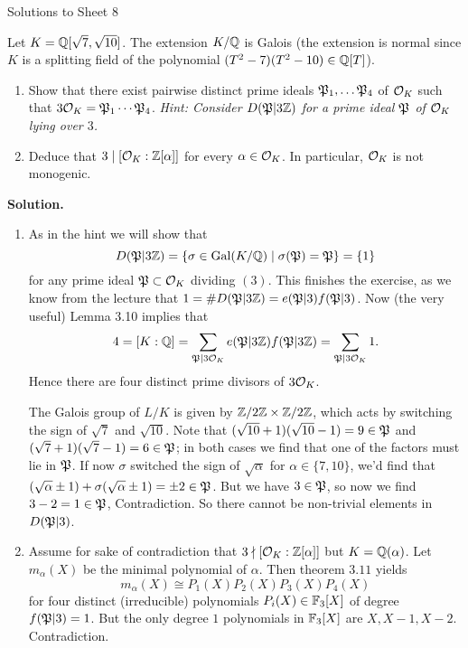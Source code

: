 \documentclass[a4paper,11pt]{article}
\begin{document}
\begin{center}
    \huge{Solutions to Sheet 8}
\end{center}

Let $K = \mathbb{Q}[\sqrt 7, \sqrt{10}]$. The extension
$K/\mathbb{Q}$ is Galois (the extension is normal since $K$ is a splitting field of the polynomial
$(T^2-7)(T^2-10) \in \mathbb{Q}[T]$).
\begin{enumerate}
    \item Show that there exist pairwise distinct prime ideals $\mathfrak{P}_1, \dots \mathfrak{P}_4$ of
        $\mathcal{O}_K$ such that $3 \mathcal{O}_K = \mathfrak{P}_1 \cdots \mathfrak{P}_4$. \textit{Hint: Consider
        $D(\mathfrak{P}|3\mathbb{Z})$ for a prime ideal $\mathfrak{P}$ of $\mathcal{O}_K$ lying over $3$.}
    \item Deduce that $3 \mid [\mathcal{O}_K:\mathbb{Z}[\alpha]]$ for every $\alpha \in \mathcal{O}_K$.
        In particular, $\mathcal{O}_K$ is not monogenic.
\end{enumerate}

\textbf{Solution.}
\begin{enumerate}[labelindent=0pt, wide] 
    \item As in the hint we will show that 
        $$D(\mathfrak{P}|3\mathbb{Z}) = \{\sigma \in \operatorname{Gal}(K/\mathbb{Q}) \mid \sigma(\mathfrak{P}) = \mathfrak{P}\} = \{1\}$$
        for any prime ideal $\mathfrak{P} \subset \mathcal{O}_K$ dividing $(3)$. This finishes the
        exercise, as we know from the lecture that $1 = \#D(\mathfrak{P}|3\mathbb{Z}) = e(\mathfrak{P}|3) 
        f(\mathfrak{P}|3)$.
        Now (the very useful) Lemma 3.10 implies that 
        \begin{equation*}
            4 = [K:\mathbb{Q}] = \sum_{\mathfrak{P} \mid 3\mathcal{O}_K} e(\mathfrak{P}|3\mathbb{Z}) f(\mathfrak{P}|3\mathbb{Z}) =
            \sum_{\mathfrak{P} \mid 3\mathcal{O}_K} 1.
        \end{equation*}
        Hence there are four distinct prime divisors of $3\mathcal{O}_K$.

        The Galois group of $L/K$ is given by $\mathbb{Z}/2\mathbb{Z} \times \mathbb{Z}/2\mathbb{Z}$, which 
        acts by switching the sign of $\sqrt 7$ and $\sqrt {10}$. Note that 
        $(\sqrt {10}+1)(\sqrt{10}-1) = 9 \in \mathfrak{P}$ and 
        $(\sqrt 7 + 1)(\sqrt 7 - 1) = 6 \in \mathfrak{P}$; in both cases we find that one 
        of the factors must lie in $\mathfrak{P}$. If now $\sigma$ switched the sign
        of $\sqrt \alpha$ for $\alpha \in \{7, 10\}$, we'd find that 
        $(\sqrt \alpha \pm 1) + \sigma(\sqrt \alpha \pm 1) = \pm 2 \in \mathfrak{P}$.
        But we have $3 \in \mathfrak{P}$, so now we find $3-2 = 1 \in \mathfrak{P}$, Contradiction.
        So there cannot be non-trivial elements in $D(\mathfrak{P}|3)$.
    \item Assume for sake of contradiction that $3 \nmid [\mathcal{O}_K:\mathbb{Z}[\alpha]]$ but
        $K = \mathbb{Q}(\alpha)$. Let $m_\alpha(X)$ be the minimal polynomial of 
        $\alpha$. Then theorem $3.11$ yields
        \begin{equation*}
            m_\alpha(X) \cong P_1(X) P_2(X) P_3(X) P_4(X)
        \end{equation*}
        for four distinct (irreducible) polynomials $P_i(X) \in \mathbb{F}_3[X]$ of
        degree $f(\mathfrak{P}|3) = 1$. But the only degree $1$ polynomials in $\mathbb{F}_3[X]$
        are $X, X-1, X-2$. Contradiction.

\end{enumerate}
\end{document}
